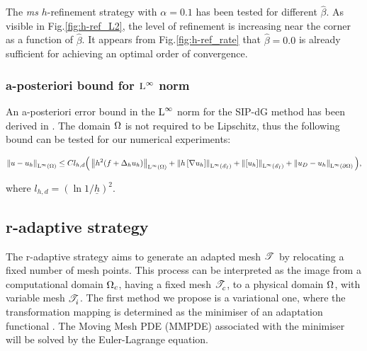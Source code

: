 \documentclass[a4paper,11pt]{article}
\begin{document}
{The \textit{ms} $h$-refinement strategy with $\alpha = 0.1$ has been tested for different $\hat{\beta}$. As visible in Fig.\ref{fig:h-ref_L2}, the level of refinement is increasing near the corner as a function of $\hat{\beta}$. It appears from Fig.\ref{fig:h-ref_rate} that $\hat{\beta} = 0.0$ is already sufficient for achieving an optimal order of convergence.

\subsubsection{a-posteriori bound for $\operatorname L^{\infty}$ norm}

An a-posteriori error bound in the $\operatorname L^{\infty}$ norm for the SIP-dG method has been derived in \cite{DG:2012}. The domain $\Omega$ is not required to be Lipschitz, thus the following bound can be tested for our numerical experiments:

\begin{equation}\label{eq:a-posteriori_Linfty}
  \left\|u-u_{h}\right\|_{\operatorname L^{\infty}(\Omega)} \leq  C l_{h,d} \Big( \left\|h^{2}(f + \Delta_{h}u_{h})\right\|_{\operatorname L^{\infty}(\Omega)} + \left\|h \left[ \nabla u_{h}\right]\right\|_{\operatorname L^{\infty}(\mathscr E_{I})} + \left\|\left[ u_{h}\right]\right\|_{\operatorname L^{\infty}(\mathscr E_{I})} + \left\|u_{D} - u_{h}\right\|_{\operatorname L^{\infty}(\partial \Omega)} \Big),
\end{equation}

where $l_{h,d} = (\ln 1/\underline{h})^{2}$. 


\subsection{r-adaptive strategy}
\label{sec:r-adaptive}
The r-adaptive strategy aims to generate an adapted mesh $\mathscr T^{}$ by relocating a fixed number of mesh points. This process can be interpreted as the image from a computational domain $\Omega_{c}$, having a fixed mesh $\mathscr T^{}_{c}$, to a physical domain $\Omega$, with variable mesh $\mathscr T^{}_{i}$. The first method we propose is a variational one, where the transformation mapping is determined as the minimiser of an adaptation functional \cite{BHR:2009,Winslow:1966}. The Moving Mesh PDE (MMPDE) associated with the minimiser will be solved by the Euler-Lagrange equation.


}
\end{document}
